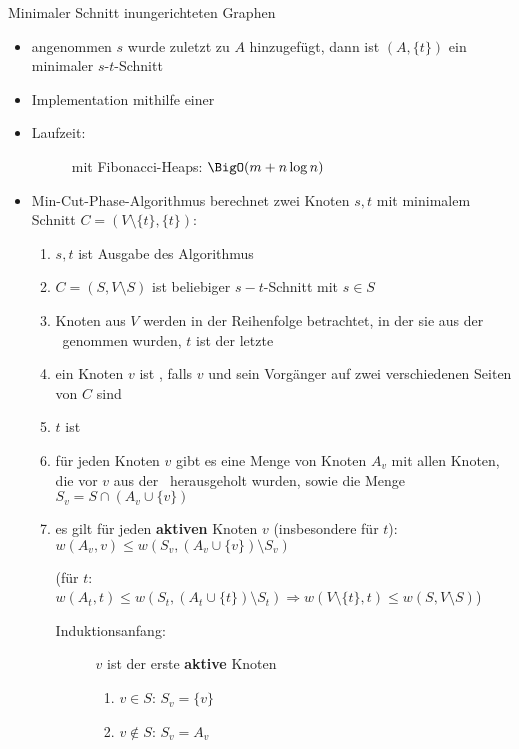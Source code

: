 \begin{TOPbreak}{Minimaler Schnitt in}{ungerichteten Graphen}
\begin{itemize}
\begin{description}
\begin{itemize}
					\item angenommen $s$ wurde zuletzt zu $A$ hinzugefügt, dann ist $(A,\{t\})$ ein minimaler $s$-$t$-Schnitt
					\item Implementation mithilfe einer \PQ
					\item \begin{description}
							\item [Laufzeit:] mit Fibonacci-Heaps: $\BigO(m+n\log n)$
						\end{description}
				\end{itemize}
		\end{description}
	\end{itemize}
	\topbreak
	\up\up
	\begin{itemize}
		\item Min-Cut-Phase-Algorithmus berechnet zwei Knoten $s,t$ mit minimalem Schnitt $C=(V\setminus \{t\},\{t\})$:\up
		\Proof\vspace*{-0.5\baselineskip}
		\newcounter{temp}
		\begin{enumerate}
			\item $s,t$ ist Ausgabe des Algorithmus
			\item $C=(S,V\setminus S)$ ist beliebiger $s-t$-Schnitt mit $s\in S$
			\item Knoten aus $V$ werden in der Reihenfolge betrachtet, in der sie aus der \PQ~genommen wurden, $t$ ist der letzte
			\item ein Knoten $v$ ist \aktiv, falls $v$ und sein Vorgänger auf zwei verschiedenen Seiten von $C$ sind
			\item $t$ ist \aktiv
			\item für jeden Knoten $v$ gibt es eine Menge von Knoten $A_v$ mit allen Knoten, die vor $v$ aus der \PQ~herausgeholt wurden, sowie die Menge $S_v = S\cap (A_v \cup \{v\})$
			\item es gilt für jeden \textbf{aktiven} Knoten $v$ (insbesondere für $t$): $w(A_v,v)\leq w(S_v, (A_v \cup \{v\})\setminus S_v)$ \par(für $t$: $w(A_t,t)\leq w(S_t, (A_t \cup \{t\})\setminus S_t) \Rightarrow w(V\setminus\{t\},t) \leq w(S, V\setminus S)$)
				\up\Proof\vspace*{-0.5\baselineskip}
				\begin{description}
					\item[Induktionsanfang:] $v$ ist der erste \textbf{aktive} Knoten
						\begin{enumerate}
							\item $v\in S$: $S_v = \{v\}$
							\item $v\notin S$: $S_v=A_v$

\end{enumerate}
\end{description}
\end{enumerate}
\end{itemize}
\end{TOPbreak}
